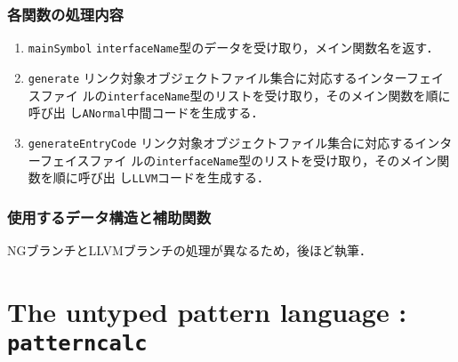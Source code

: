 \documentclass{jbook}
\newif\ifjp
\newcommand{\txt}[2]{#2}
\newcommand{\code}[1]{\mbox{\large\tt #1}}
\begin{document}
\subsection{各関数の処理内容}
\begin{enumerate}
\item \code{mainSymbol}
	\code{interfaceName}型のデータを受け取り，メイン関数名を返す．
\item \code{generate}
リンク対象オブジェクトファイル集合に対応するインターフェイスファイ
ルの\code{interfaceName}型のリストを受け取り，そのメイン関数を順に呼び出
し\code{ANormal}中間コードを生成する．
\item \code{generateEntryCode}
リンク対象オブジェクトファイル集合に対応するインターフェイスファイ
ルの\code{interfaceName}型のリストを受け取り，そのメイン関数を順に呼び出
し\code{LLVM}コードを生成する．
\end{enumerate}

\subsection{使用するデータ構造と補助関数}

	NGブランチとLLVMブランチの処理が異なるため，後ほど執筆．

\else%
\fi%



% 
\chapter{\txt
{型無しパターン言語：\code{patterncalc}}
{The untyped pattern language : \code{patterncalc}}
}
\label{chap:PatternCalc}

\ifjp%
\begin{enumerate}
\item ソースロケーションとファイル構成
ディレクトリ \code{src/compiler/patterncalc/main}下の以下のファイルからなる．
\begin{itemize}
\item \code{PatternCalc.ppg} 型無しパターン言語のソース言語定義ファイル
\item \code{PatternCalcInterface.ppg} 型無しパターン言語のインターフェイス言語定義ファイル
\end{itemize}

\item 他モジュールとのインターフェイス
\begin{itemize}
\item 構文論的評価モジュール\code{src/compiler/elaborater}の出力言語．
\item 名前評価・モジュールコンパイルモジュール\code{src/compiler/nameevaluation}の入力言語．
\end{itemize}
\end{enumerate}
\else%
\fi%
\end{document}
